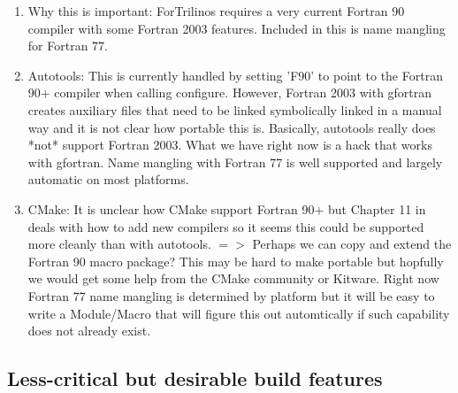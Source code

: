 \documentclass[pdf,ps2pdf,11pt]{SANDreport}
\begin{document}
\begin{enumerate}
  \begin{enumerate}

  {}\item Why this is important: ForTrilinos requires a very current
  Fortran 90 compiler with some Fortran 2003 features.  Included in
  this is name mangling for Fortran 77.

  {}\item Autotools: This is currently handled by setting 'F90' to
  point to the Fortran 90+ compiler when calling configure.  However,
  Fortran 2003 with gfortran creates auxiliary files that need to be
  linked symbolically linked in a manual way and it is not clear how
  portable this is.  Basically, autotools really does *not* support
  Fortran 2003.  What we have right now is a hack that works with
  gfortran.  Name mangling with Fortran 77 is well supported and
  largely automatic on most platforms.

  {}\item CMake: It is unclear how CMake support Fortran 90+ but
  Chapter 11 in {}\cite{MasteringCMake_fourth} deals with how to add
  new compilers so it seems this could be supported more cleanly than
  with autotools. $=>$ Perhaps we can copy and extend the Fortran 90
  macro package?  This may be hard to make portable but hopfully we
  would get some help from the CMake community or Kitware.  Right now
  Fortran 77 name mangling is determined by platform but it will be
  easy to write a Module/Macro that will figure this out automtically
  if such capability does not already exist.

  \end{enumerate}

\end{enumerate}


%
{}\subsection{Less-critical but desirable build features}
%
\end{document}
